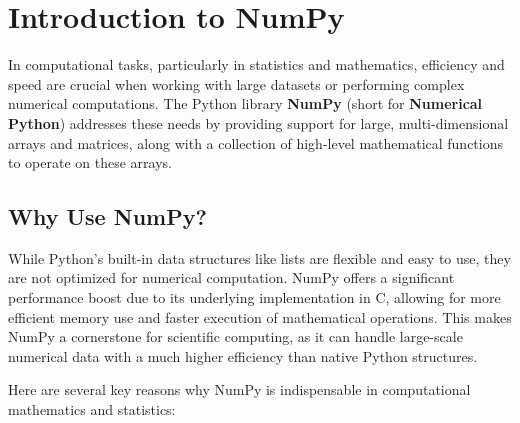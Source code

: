 \documentclass[
  letterpaper,
  DIV=11,
  numbers=noendperiod]{scrreprt}
\begin{document}
\hypertarget{introduction-to-numpy}{%
\section{Introduction to NumPy}\label{introduction-to-numpy}}

In computational tasks, particularly in statistics and mathematics,
efficiency and speed are crucial when working with large datasets or
performing complex numerical computations. The Python library
\textbf{NumPy} (short for \textbf{Numerical Python}) addresses these
needs by providing support for large, multi-dimensional arrays and
matrices, along with a collection of high-level mathematical functions
to operate on these arrays.

\hypertarget{why-use-numpy}{%
\subsection{Why Use NumPy?}\label{why-use-numpy}}

While Python's built-in data structures like lists are flexible and easy
to use, they are not optimized for numerical computation. NumPy offers a
significant performance boost due to its underlying implementation in C,
allowing for more efficient memory use and faster execution of
mathematical operations. This makes NumPy a cornerstone for scientific
computing, as it can handle large-scale numerical data with a much
higher efficiency than native Python structures.

Here are several key reasons why NumPy is indispensable in computational
mathematics and statistics:
\end{document}
